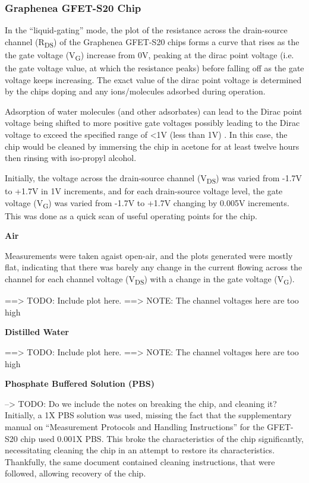 \documentclass[]{article}
\begin{document}
\subsubsection{Graphenea GFET-S20 Chip}

In the ``liquid-gating'' mode, the plot of the resistance across the drain-source channel (R\textsubscript{DS}) of the Graphenea GFET-S20 chips forms a curve that rises as the the gate voltage (V\textsubscript{G}) increase from 0V, peaking at the dirac point voltage (i.e. the gate voltage value, at which the resistance peaks) before falling off as the gate voltage keeps increasing. The exact value of the dirac point voltage is determined by the chips doping and any ions/molecules adsorbed during operation.

Adsorption of water molecules (and other adsorbates) can lead to the Dirac point voltage being shifted to more positive gate voltages \textcite{gfet-mphi-s2x} possibly leading to the Dirac voltage to exceed the specified range of <1V (less than 1V) \textcite{gfet-ds-s20}. In this case, the chip would be cleaned by immersing the chip in acetone for at least twelve hours then rinsing with iso-propyl alcohol.

Initially, the voltage across the drain-source channel (V\textsubscript{DS}) was varied from -1.7V to +1.7V in 1V increments, and for each drain-source voltage level, the gate voltage (V\textsubscript{G}) was varied from -1.7V to +1.7V changing by 0.005V increments. This was done as a quick scan of useful operating points for the chip.

\textbf{Air}

Measurements were taken agaist open-air, and the plots generated were mostly flat, indicating that there was barely any change in the current flowing across the channel for each channel voltage (V\textsubscript{DS}) with a change in the gate voltage (V\textsubscript{G}).

==> TODO: Include plot here.
==> NOTE: The channel voltages here are too high

\textbf{Distilled Water}

==> TODO: Include plot here.
==> NOTE: The channel voltages here are too high

\textbf{Phosphate Buffered Solution (PBS)}

--> TODO: Do we include the notes on breaking the chip, and cleaning it?
Initially, a 1X PBS solution was used, missing the fact that the supplementary manual on ``Measurement Protocols and Handling Instructions'' for the GFET-S20 chip \textcite{gfet-mphi-s2x} used 0.001X PBS. This broke the characteristics of the chip significantly, necessitating cleaning the chip in an attempt to restore its characteristics. Thankfully, the same document contained cleaning instructions, that were followed, allowing recovery of the chip.
\end{document}
